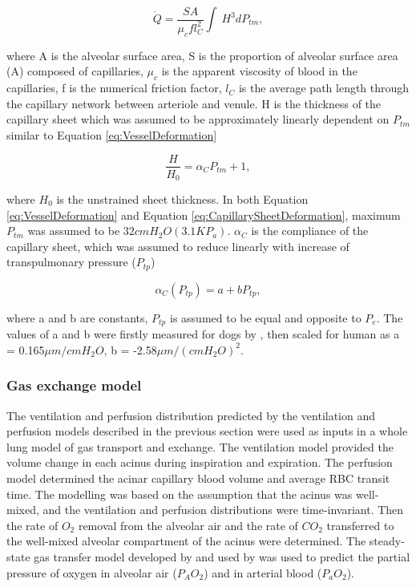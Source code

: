 \begin{equation}
 \label{eq:CapillarySheetFlow}
 \dot{Q} = \frac{SA}{\mu_c f l^{2}_{C}} \int\ H^{3}dP_{tm},
\end{equation}

\noindent where A is the alveolar surface area, S is the proportion of alveolar surface area (A) composed of capillaries, $\mu_c$ is the apparent viscosity of blood in the capillaries, f is the numerical friction factor, $l_C$ is the average path length through the capillary network between arteriole and venule. H is the thickness of the capillary sheet which was assumed to be approximately linearly dependent on $P_{tm}$ similar to Equation \ref{eq:VesselDeformation}

\begin{equation}
 \label{eq:CapillarySheetDeformation}
 \frac{H}{H_0} = \alpha_C P_{tm} + 1,
\end{equation}

\noindent where $H_0$ is the unstrained sheet thickness. In both Equation \ref{eq:VesselDeformation} and Equation \ref{eq:CapillarySheetDeformation}, maximum $P_{tm}$ was assumed to be $32 cmH_2 O(3.1KP_a)$. $\alpha_C$ is the compliance of the capillary sheet, which was assumed to reduce linearly with increase of transpulmonary pressure ($P_{tp}$)

\begin{equation} 
 \label{eq:CapillaryCompliance}
 \alpha_C(P_{tp}) = a + bP_{tp},
\end{equation}

\noindent where a and b are constants, $P_{tp}$ is assumed to be equal and opposite to $P_e$. The values of a and b were firstly measured for dogs by \cite{glazier1969measurements}, then scaled for human as a = 0.165$\mu m/cmH_2O$, b = -2.58$\mu m/{(cmH_2O)}^2$.

\subsubsection{Gas exchange model}
The ventilation and perfusion distribution predicted by the ventilation and perfusion models described in the previous section were used as inputs in a whole lung model of gas transport and exchange. The ventilation model provided the volume change in each acinus during inspiration and expiration. The perfusion model determined the acinar capillary blood volume and average RBC transit time. The modelling was based on the assumption that the acinus was well-mixed, and the ventilation and perfusion distributions were time-invariant. Then the rate of $O_2$ removal from the alveolar air and the rate of $CO_2$ transferred to the well-mixed alveolar compartment of the acinus were determined. The steady-state gas transfer model developed by \cite{kapitan1986computer} and used by \cite{clark2014lack} was used to predict the partial pressure of oxygen in alveolar air ($P_AO_2$) and in arterial blood ($P_aO_2$).

